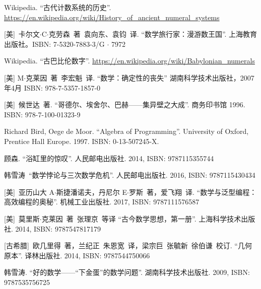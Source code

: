 \documentclass[UTF8]{article}
\begin{document}
\fi


\begin{thebibliography}{99}


Wikipedia. ``古代计数系统的历史''. \url{https://en.wikipedia.org/wiki/History_of_ancient_numeral_systems}

[美]\ 卡尔文$\cdot$C$\cdot$克劳森\ 著\ 袁向东、袁钧\ 译. ``数学旅行家：漫游数王国''. 上海教育出版社。ISBN: 7-5320-7883-3/G $\cdot$ 7972

Wikipedia. ``古巴比伦数字''. \url{https://en.wikipedia.org/wiki/Babylonian_numerals}

[美] M$\cdot$克莱因\ 著\ 李宏魁\ 译. ``数学：确定性的丧失'' 湖南科学技术出版社，2007年4月 ISBN: 978-7-5357-1857-0

[美]\ 候世达\ 著. ``哥德尔、埃舍尔、巴赫——集异壁之大成''. 商务印书馆 1996. ISBN: 978-7-100-01323-9

Richard Bird, Oege de Moor. ``Algebra of Programming''. University of Oxford, Prentice Hall Europe. 1997. ISBN: 0-13-507245-X.

顾森. ``浴缸里的惊叹''. 人民邮电出版社. 2014, ISBN: 9787115355744


韩雪涛\ ``数学悖论与三次数学危机''. 人民邮电出版社. 2016, ISBN: 9787115430434

[美]\ 亚历山大 A$\cdot$斯捷潘诺夫，丹尼尔 E$\cdot$罗斯\ 著，爱飞翔\ 译. ``数学与泛型编程：高效编程的奥秘''. 机械工业出版社. 2017, ISBN: 9787111576587

[美]\ 莫里斯$\cdot$克莱因\ 著\ 张理京\ 等译 ``古今数学思想，第一册''. 上海科学技术出版社. 2014, ISBN: 9787547817179

[古希腊]\ 欧几里得\ 著，兰纪正\ 朱恩宽\ 译，梁宗巨\ 张毓新\ 徐伯谦\ 校订. ``几何原本''. 译林出版社. 2014, ISBN: 9787544750066

韩雪涛. ``好的数学——“下金蛋”的数学问题''. 湖南科学技术出版社. 2009, ISBN: 9787535756725


\end{thebibliography}
\end{document}
